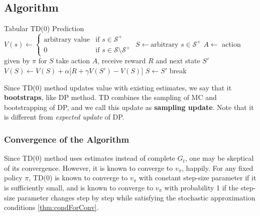 \documentclass[../../main.tex]{subfiles}
\begin{document}
    \subsection{Algorithm}
        {Tabular TD(0) Prediction}
        { \\
        \inputitem{$\alpha \in (0,1]$}{step size parameter}}
        {}
        {
            {
                $V(s) \leftarrow 
                \begin{cases}
                    \text{arbitrary value} &\text{if } s \in \mathcal{S^+} \\
                    0 &\text{if } s \in \mathcal{S} \setminus \mathcal{S^+}
                \end{cases}$\;
            }
            {
                $S \leftarrow \text{arbitrary } s \in \mathcal{S^+}$\;
                {
                    $A \leftarrow$ action given by $\pi$ for $S$\;
                    take action $A$, receive reward $R$ and next state $S'$\;
                    $V(S) \leftarrow V(S) + \alpha\big[R + \gamma V(S') - V(S)\big]$\;
                    $S \leftarrow S'$\;
                    {
                        break\;
                    }
                }
            }
        }

        Since TD(0) method updates value with existing estimates, we say that it \textbf{bootstraps}, like DP method.
        TD combines the sampling of MC and bootstrapping of DP, and we call this update as \textbf{sampling update}.
        Note that it is different from \emph{expected update} of DP.

        \subsubsection{Convergence of the Algorithm}
            Since TD(0) method uses estimates instead of complete $G_t$, one may be skeptical of its convergence.
            However, it is known to converge to $v_\pi$, happily. For any fixed policy $\pi$, TD(0) is known to converge to $v_\pi$
            with constant step-size parameter if it is sufficiently small, and is known to converge to $v_\pi$ with probability 1 if
            the step-size parameter changes step by step while satisfying the stochastic approximation conditions \ref{thm:condForConv}.
\end{document}
